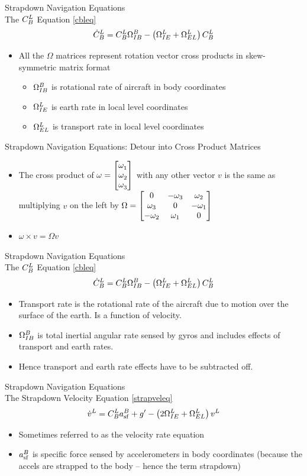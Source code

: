 \begin{frame}
Strapdown Navigation Equations\\
The $\dcm{B}{L}$ Equation \eqref{cbleq}
\[\cbleq\]
\begin{itemize}
\item All the $\Omega$ matrices represent rotation vector cross products in skew-symmetric matrix format
\begin{itemize}
 \item $\rotmat{I}{B}^B$ is rotational rate of aircraft in body
coordinates
\item $\rotmat{I}{E}^L$ is earth rate in local level coordinates
\item $\rotmat{E}{L}^L$ is transport rate in local level
coordinates
\end{itemize}
\end{itemize}
\end{frame}
\begin{frame}
Strapdown Navigation Equations: Detour into Cross Product Matrices\\
\begin{itemize}
\item The cross product of $\omega=\colvecthree{\omega}{}$ with any other vector $v$ is the same as multiplying $v$ on the left by
$\Omega = \skewsymmat{\omega}{1}{2}{3}$
\item $\omega \times v=\Omega v$
\end{itemize}
\end{frame}
\begin{frame}
Strapdown Navigation Equations\\
The $\dcm{B}{L}$ Equation \eqref{cbleq}
\[\cbleq\]
\begin{itemize}
\item Transport rate is the rotational rate of the aircraft due to
motion over the surface of the earth.  Is a function of velocity.
\item $\rotmat{I}{B}^B$ is total inertial angular rate sensed by gyros and includes effects of
transport and earth rates.
\item Hence transport and earth rate effects have to be subtracted
off.
\end{itemize}
\end{frame}
\begin{frame}
Strapdown Navigation Equations\\
The Strapdown Velocity Equation \eqref{strapveleq}
\[\strapveleq\]
 \begin{itemize}
 \item Sometimes referred to as the velocity rate equation
 \item $\specforce^B$ is specific force sensed by accelerometers in
 body coordinates (because the accels are strapped to the body --
 hence the term strapdown)
\end{itemize}
\end{frame}
